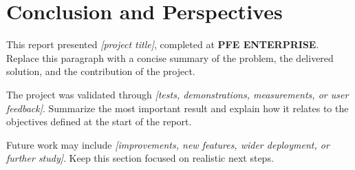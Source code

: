 \chapter*{Conclusion and Perspectives}

This report presented \textit{[project title]}, completed at \textbf{PFE ENTERPRISE}. Replace this paragraph with a concise summary of the problem, the delivered solution, and the contribution of the project.

The project was validated through \textit{[tests, demonstrations, measurements, or user feedback]}. Summarize the most important result and explain how it relates to the objectives defined at the start of the report.

Future work may include \textit{[improvements, new features, wider deployment, or further study]}. Keep this section focused on realistic next steps.
